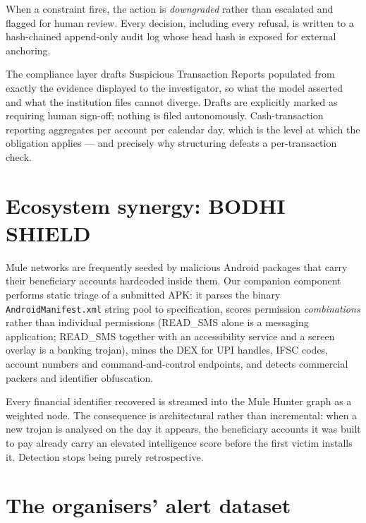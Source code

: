 \documentclass{article}
\begin{document}
When a constraint fires, the action is \emph{downgraded} rather than escalated
and flagged for human review. Every decision, including every refusal, is
written to a hash-chained append-only audit log whose head hash is exposed for
external anchoring.

The compliance layer drafts Suspicious Transaction Reports populated from
exactly the evidence displayed to the investigator, so what the model asserted
and what the institution files cannot diverge. Drafts are explicitly marked as
requiring human sign-off; nothing is filed autonomously. Cash-transaction
reporting aggregates per account per calendar day, which is the level at which
the obligation applies --- and precisely why structuring defeats a
per-transaction check.

\section{Ecosystem synergy: BODHI SHIELD}
\label{sec:shield}

Mule networks are frequently seeded by malicious Android packages that carry
their beneficiary accounts hardcoded inside them. Our companion component
performs static triage of a submitted APK: it parses the binary
\texttt{AndroidManifest.xml} string pool to specification, scores permission
\emph{combinations} rather than individual permissions (READ\_SMS alone is a
messaging application; READ\_SMS together with an accessibility service and a
screen overlay is a banking trojan), mines the DEX for UPI handles, IFSC codes,
account numbers and command-and-control endpoints, and detects commercial
packers and identifier obfuscation.

Every financial identifier recovered is streamed into the Mule Hunter graph as a
weighted node. The consequence is architectural rather than incremental: when a
new trojan is analysed on the day it appears, the beneficiary accounts it was
built to pay already carry an elevated intelligence score before the first
victim installs it. Detection stops being purely retrospective.

\section{The organisers' alert dataset}
\label{sec:boi}
\end{document}
